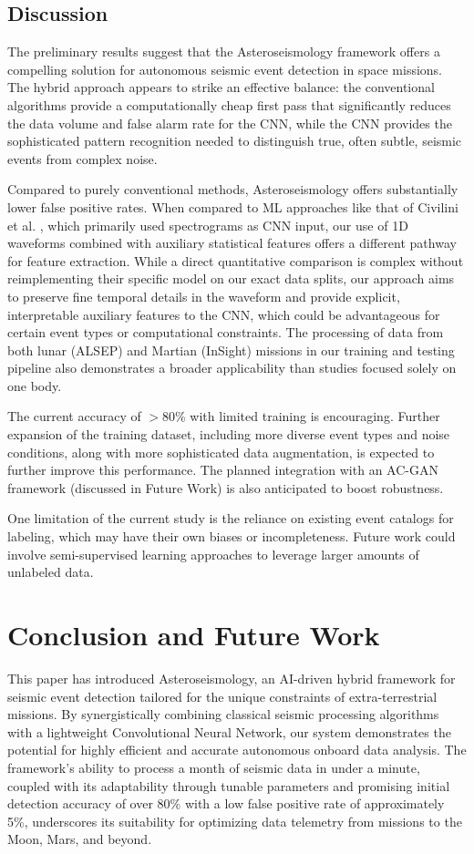 \documentclass[conference]{IEEEtran}
\begin{document}
\subsection{Discussion}
The preliminary results suggest that the Asteroseismology framework offers a compelling solution for autonomous seismic event detection in space missions. The hybrid approach appears to strike an effective balance: the conventional algorithms provide a computationally cheap first pass that significantly reduces the data volume and false alarm rate for the CNN, while the CNN provides the sophisticated pattern recognition needed to distinguish true, often subtle, seismic events from complex noise.

Compared to purely conventional methods, Asteroseismology offers substantially lower false positive rates. When compared to ML approaches like that of Civilini et al. \cite{b1}, which primarily used spectrograms as CNN input, our use of 1D waveforms combined with auxiliary statistical features offers a different pathway for feature extraction. While a direct quantitative comparison is complex without reimplementing their specific model on our exact data splits, our approach aims to preserve fine temporal details in the waveform and provide explicit, interpretable auxiliary features to the CNN, which could be advantageous for certain event types or computational constraints. The processing of data from both lunar (ALSEP) and Martian (InSight) missions in our training and testing pipeline also demonstrates a broader applicability than studies focused solely on one body.

The current accuracy of $>$80\% with limited training is encouraging. Further expansion of the training dataset, including more diverse event types and noise conditions, along with more sophisticated data augmentation, is expected to further improve this performance. The planned integration with an AC-GAN framework (discussed in Future Work) is also anticipated to boost robustness.

One limitation of the current study is the reliance on existing event catalogs for labeling, which may have their own biases or incompleteness. Future work could involve semi-supervised learning approaches to leverage larger amounts of unlabeled data.

\section{Conclusion and Future Work}
\label{sec:conclusion}
This paper has introduced Asteroseismology, an AI-driven hybrid framework for seismic event detection tailored for the unique constraints of extra-terrestrial missions. By synergistically combining classical seismic processing algorithms with a lightweight Convolutional Neural Network, our system demonstrates the potential for highly efficient and accurate autonomous onboard data analysis. The framework's ability to process a month of seismic data in under a minute, coupled with its adaptability through tunable parameters and promising initial detection accuracy of over 80\% with a low false positive rate of approximately 5\%, underscores its suitability for optimizing data telemetry from missions to the Moon, Mars, and beyond.
\end{document}
